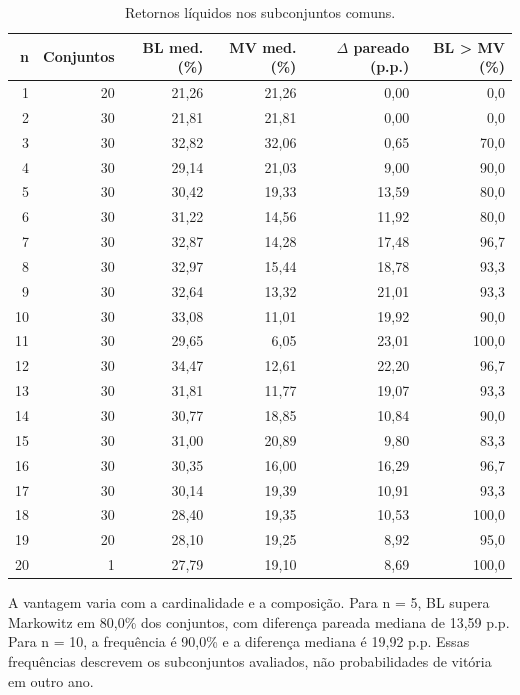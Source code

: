 \begin{table}[H]
\centering
\caption{Retornos líquidos nos subconjuntos comuns.}
\label{tab:retornos_comuns}
{\footnotesize
\begin{tabular}{@{}rrrrrr@{}}
\hline
n & Conjuntos & BL med. (\%) & MV med. (\%) & $\Delta$ pareado (p.p.) & BL > MV (\%) \\ \hline
1 & 20 & 21,26 & 21,26 & 0,00 & 0,0 \\
2 & 30 & 21,81 & 21,81 & 0,00 & 0,0 \\
3 & 30 & 32,82 & 32,06 & 0,65 & 70,0 \\
4 & 30 & 29,14 & 21,03 & 9,00 & 90,0 \\
5 & 30 & 30,42 & 19,33 & 13,59 & 80,0 \\
6 & 30 & 31,22 & 14,56 & 11,92 & 80,0 \\
7 & 30 & 32,87 & 14,28 & 17,48 & 96,7 \\
8 & 30 & 32,97 & 15,44 & 18,78 & 93,3 \\
9 & 30 & 32,64 & 13,32 & 21,01 & 93,3 \\
10 & 30 & 33,08 & 11,01 & 19,92 & 90,0 \\
11 & 30 & 29,65 & 6,05 & 23,01 & 100,0 \\
12 & 30 & 34,47 & 12,61 & 22,20 & 96,7 \\
13 & 30 & 31,81 & 11,77 & 19,07 & 93,3 \\
14 & 30 & 30,77 & 18,85 & 10,84 & 90,0 \\
15 & 30 & 31,00 & 20,89 & 9,80 & 83,3 \\
16 & 30 & 30,35 & 16,00 & 16,29 & 96,7 \\
17 & 30 & 30,14 & 19,39 & 10,91 & 93,3 \\
18 & 30 & 28,40 & 19,35 & 10,53 & 100,0 \\
19 & 20 & 28,10 & 19,25 & 8,92 & 95,0 \\
20 & 1 & 27,79 & 19,10 & 8,69 & 100,0 \\
\hline
\end{tabular}}
\par{}
\end{table}
A vantagem varia com a cardinalidade e a composição. Para n = 5, BL supera Markowitz em 80,0\% dos conjuntos, com diferença pareada mediana de 13,59 p.p. Para n = 10, a frequência é 90,0\% e a diferença mediana é 19,92 p.p. Essas frequências descrevem os subconjuntos avaliados, não probabilidades de vitória em outro ano.


